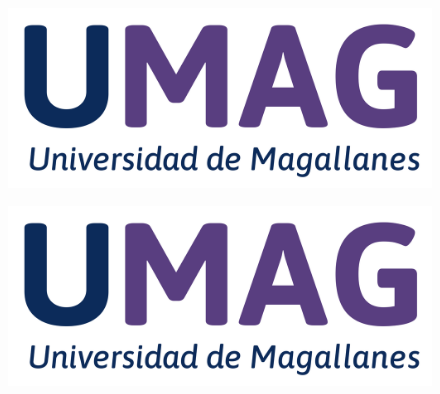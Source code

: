 \begin{titlepage}
    \latofont %
   
    \ifbwcover
        \color{frontpagedark} %
    \else
        \color{white} %
    \fi
    
    \vspace*{\baselineskip} %

    \ifbwcover
        \begin{figure}
            \includegraphics[width=0.32\linewidth]{Figures/Theme/UMAG.png}
        \end{figure}
    \else
        \begin{figure}
            \includegraphics[width=0.32\linewidth]{Figures/Theme/UMAG.png}
        \end{figure}
    \fi

    \vspace{5.5\baselineskip}

	\noindent

    \vspace{0.8\baselineskip}

    \noindent

    \vspace{35pt}  

    {\noindent\bfseries\fontsize{14}{19}\selectfont\firstauthorname}

    \ifdefined\secondauthorname
        \vspace{8pt}
        {\noindent\bfseries\fontsize{14}{19}\selectfont\secondauthorname}
	\fi


\end{titlepage}
